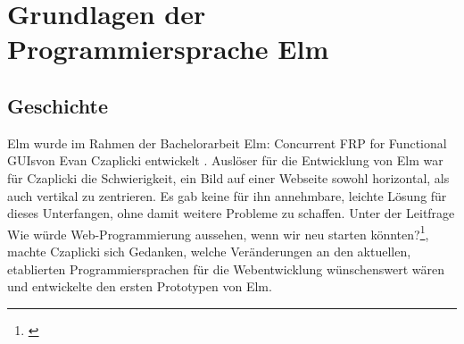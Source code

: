 \section{Grundlagen der Programmiersprache Elm}
\label{sec:grundlagen-programmiersprache-elm}

\subsection{Geschichte}
\label{sec:Geschichte}
Elm wurde im Rahmen der Bachelorarbeit \glqq Elm: Concurrent FRP for Functional GUIs\grqq von Evan Czaplicki entwickelt \cite[Vgl.]{evan-thesis}.
Auslöser für die Entwicklung von Elm war für Czaplicki die Schwierigkeit, ein Bild auf einer Webseite sowohl horizontal, als auch vertikal zu zentrieren.\cite[Vgl.]{evan-center} Es gab keine für ihn annehmbare, leichte Lösung für dieses Unterfangen, ohne damit weitere Probleme zu schaffen. Unter der Leitfrage \glqq Wie würde Web-Programmierung aussehen, wenn wir neu starten könnten?\grqq\footnote{\cite[Vgl. Eigene Übersetzung]{web-programming-restarted}}, machte Czaplicki sich Gedanken, welche Veränderungen an den aktuellen, etablierten Programmiersprachen für die Webentwicklung wünschenswert wären und entwickelte den ersten Prototypen von Elm.

